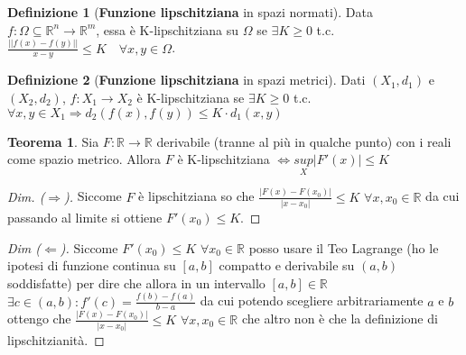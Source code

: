 \documentclass{article}
\theoremstyle{definition}
\newtheorem{theorem}{Teorema}[section]
\theoremstyle{definition}
\theoremstyle{definition}
\newtheorem{definition}{Definizione}[section]
\theoremstyle{definition}
\theoremstyle{definition}
\begin{document}
\begin{definition}[\textbf{Funzione lipschitziana} in spazi normati]
    Data $f:\Omega \subseteq \mathbb{R}^n \rightarrow \mathbb{R}^m$, essa è K-lipschitziana su $\Omega$ se $\exists K \geq 0$ t.c. $\displaystyle{\frac{\left|\left|f(x)-f(y)\right|\right|}{x-y}\leq K \quad \forall x,y \in\Omega}$.
\end{definition}

\begin{definition}[\textbf{Funzione lipschitziana} in spazi metrici]
    Dati $(X_1,d_1)$ e $(X_2,d_2)$, $f:X_1\rightarrow X_2$ è K-lipschitziana se $\exists K \geq 0$ t.c. $\displaystyle{\forall x,y \in X_1 \Rightarrow d_2(f(x),f(y))\leq K\cdot d_1(x,y)}$ 
\end{definition}

\begin{theorem}
    Sia $F:\mathbb{R} \rightarrow \mathbb{R}$ derivabile (tranne al più in qualche punto) con i reali come spazio metrico. Allora $F$ è K-lipschitziana $\Leftrightarrow \underset{X}{sup}\left|F'(x)\right|\leq K$
    \begin{proof}[Dim. ($\Rightarrow$)]
        Siccome $F$ è lipschitziana so che $\displaystyle{\frac{\left|F(x)-F(x_0)\right|}{\left|x-x_0\right|}\leq K}$ $\forall x,x_0 \in \mathbb{R}$ da cui passando al limite si ottiene $F'(x_0)\leq K$.
    \end{proof}
    \begin{proof}[Dim ($\Leftarrow$)]
        Siccome $F'(x_0)\leq K$ $\forall x_0 \in \mathbb{R}$ posso usare il Teo Lagrange (ho le ipotesi di funzione continua su $[a,b]$ compatto e derivabile su $(a,b)$ soddisfatte) per dire che allora in un intervallo $[a,b] \in \mathbb{R}$ $\exists c\in(a,b):f'(c)=\frac{f(b)-f(a)}{b-a}$ da cui potendo scegliere arbitrariamente $a$ e $b$ ottengo che $\frac{\left|F(x)-F(x_0)\right|}{\left|x-x_0\right|}\leq K$ $\forall x,x_0 \in \mathbb{R}$ che altro non è che la definizione di lipschitzianità.
    \end{proof}
\end{theorem}
\end{document}
